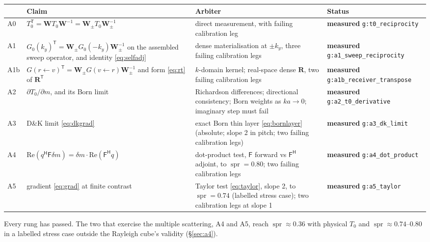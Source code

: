 \documentclass[11pt,a4paper]{article}
\newcommand{\Tz}{T_0}
\newcommand{\Gz}{G_0}
\newcommand{\bW}{\mathbf{W}}
\newcommand{\bR}{\mathbf{R}}
\newcommand{\T}{\mathsf{T}}
\newcommand{\meas}{\textcolor{green!40!black}{\textbf{measured}}}
\newcommand{\gtz}{\nolinkurl{g:t0_reciprocity}}
\begin{document}
\begin{center}
\small
\begin{tabular}{@{}lL{0.34\textwidth}L{0.34\textwidth}L{0.17\textwidth}@{}}
\toprule
& Claim & Arbiter & Status \\
\midrule
A0 & $\Tz^{\T} = \bW\Tz\bW^{-1} = \mathbf{W}_{\pm}\Tz\mathbf{W}_{\pm}^{-1}$ & direct measurement, with failing calibration leg & \meas{} \gtz \\
A1 & $\Gz(k_y)^{\T} = \mathbf{W}_{\pm}\Gz(-k_y)\mathbf{W}_{\pm}^{-1}$ on the assembled sweep operator, and
     identity \eqref{eq:selfadj} & dense materialisation at $\pm k_y$, three failing calibration legs
     & \meas{} \nolinkurl{g:a1_sweep_reciprocity} \\
A1b & $G(r\!\leftarrow\!v)^{\T} = \mathbf{W}_{\pm}G(v\!\leftarrow\!r)\mathbf{W}_{\pm}^{-1}$ and form
      \eqref{eq:rt} of $\bR^{\T}$ & $k$-domain kernel; real-space dense $\bR$, two failing calibration legs
      & \meas{} \nolinkurl{g:a1b_receiver_transpose} \\
A2 & $\partial\Tz/\partial m$, and its Born limit & Richardson differences; directional consistency;
      Born weights as $ka\to0$; imaginary step must fail & \meas{} \nolinkurl{g:a2_t0_derivative} \\
A3 & D\&K limit \eqref{eq:dkgrad} & exact Born thin layer \eqref{eq:bornlayer} (absolute; slope 2 in
      pitch; two failing calibration legs) & \meas{} \nolinkurl{g:a3_dk_limit} \\
A4 & $\mathrm{Re}(q^{\mathsf H}\mathsf{F}\delta m) = \delta m\cdot\mathrm{Re}(\mathsf{F}^{\mathsf H}q)$ & dot-product
     test, $\mathsf{F}$ forward vs $\mathsf{F}^{\mathsf H}$ adjoint, to $\operatorname{spr}=0.80$; two failing calibration legs
     & \meas{} \nolinkurl{g:a4_dot_product} \\
A5 & gradient \eqref{eq:grad} at finite contrast & Taylor test \eqref{eq:taylor}, slope 2, to
     $\operatorname{spr}=0.74$ (labelled stress case); two calibration legs at slope 1 & \meas{} \nolinkurl{g:a5_taylor} \\
\bottomrule
\end{tabular}
\end{center}

Every rung has passed. The two that exercise the multiple scattering, A4 and A5, reach
$\operatorname{spr}\approx0.36$ with physical $\Tz$ and $\operatorname{spr}\approx0.74$--$0.80$ in a labelled stress case outside
the Rayleigh cube's validity (\S\ref{sec:a4}).

\end{document}
